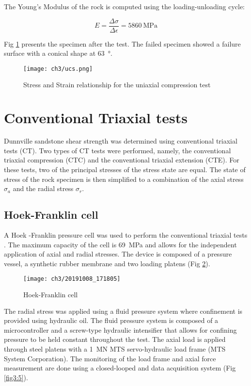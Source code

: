 The Young’s Modulus of the rock is computed using the loading-unloading cycle:

\begin{equation}
    E=\frac{\Delta\sigma}{\Delta\epsilon} = \SI{5860}{\mega\pascal}
\end{equation}

Fig \ref{fig3:3} presents the specimen after the test. The failed specimen showed a failure surface with a conical shape at \SI{63}{\degree}. 

\begin{figure}[tb]
    \centering
    \texttt{[image: ch3/ucs.png]}
    \caption{Stress and Strain relationship for the uniaxial compression test}
    \label{fig3:3}
\end{figure} 

\section{Conventional Triaxial tests}\label{Conventional_Triaxial_tests}

Dunnville sandstone shear strength was determined using conventional triaxial tests (CT). Two types of CT tests were performed, namely, the conventional triaxial compression (CTC) and the conventional triaxial extension (CTE). For these tests, two of the principal stresses of the stress state are equal. The state of stress of the rock specimen is then simplified to a combination of the axial stress $\sigma_a$ and the radial stress $\sigma_r$. 

\subsection{Hoek-Franklin cell}

A Hoek -Franklin pressure cell was used to perform the conventional triaxial tests \cite{Franklin1970}. The maximum capacity of the cell is \SI{69}{MPa} and allows for the independent application of axial and radial stresses. The device is composed of a pressure vessel, a synthetic rubber membrane and two loading platens (Fig \ref{fig3:4}).

\begin{figure}[tb]
    \centering
    \texttt{[image: ch3/20191008\_171805]}
    \caption{Hoek-Franklin cell}
    \label{fig3:4}
\end{figure} 

The radial stress was applied using a fluid pressure system where confinement is provided using hydraulic oil. The fluid pressure system is composed of a microcontroller and a screw-type hydraulic intensifier that allows for confining pressure to be held constant throughout the test. The axial load is applied through steel platens with a \SI{1}{\mega\newton} MTS servo-hydraulic load frame (MTS System Corporation). The monitoring of the load frame and axial force measurement are done using a closed-looped and data acquisition system (Fig \ref{fig3:5}).

